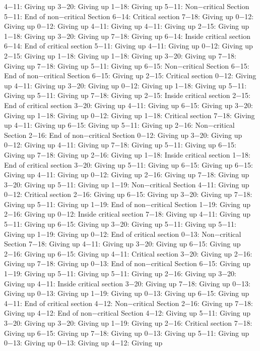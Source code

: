 4−11: Giving up
3−20: Giving up
1−18: Giving up
5−11: Non−critical Section
5−11: End of non−critical Section
6−14: Critical section
7−18: Giving up
0−12: Giving up
0−12: Giving up
4−11: Giving up
4−11: Giving up
2−15: Giving up
1−18: Giving up
3−20: Giving up
7−18: Giving up
6−14: Inside critical section
6−14: End of critical section
5−11: Giving up
4−11: Giving up
0−12: Giving up
2−15: Giving up
1−18: Giving up
1−18: Giving up
3−20: Giving up
7−18: Giving up
7−18: Giving up
5−11: Giving up
6−15: Non−critical Section
6−15: End of non−critical Section
6−15: Giving up
2−15: Critical section
0−12: Giving up
4−11: Giving up
3−20: Giving up
0−12: Giving up
1−18: Giving up
5−11: Giving up
5−11: Giving up
7−18: Giving up
2−15: Inside critical section
2−15: End of critical section
3−20: Giving up
4−11: Giving up
6−15: Giving up
3−20: Giving up
1−18: Giving up
0−12: Giving up
1−18: Critical section
7−18: Giving up
4−11: Giving up
6−15: Giving up
5−11: Giving up
2−16: Non−critical Section
2−16: End of non−critical Section
0−12: Giving up
3−20: Giving up
0−12: Giving up
4−11: Giving up
7−18: Giving up
5−11: Giving up
6−15: Giving up
7−18: Giving up
2−16: Giving up
1−18: Inside critical section
1−18: End of critical section
3−20: Giving up
5−11: Giving up
6−15: Giving up
6−15: Giving up
4−11: Giving up
0−12: Giving up
2−16: Giving up
7−18: Giving up
3−20: Giving up
5−11: Giving up
1−19: Non−critical Section
4−11: Giving up
0−12: Critical section
2−16: Giving up
6−15: Giving up
3−20: Giving up
7−18: Giving up
5−11: Giving up
1−19: End of non−critical Section
1−19: Giving up
2−16: Giving up
0−12: Inside critical section
7−18: Giving up
4−11: Giving up
5−11: Giving up
6−15: Giving up
3−20: Giving up
5−11: Giving up
5−11: Giving up
1−19: Giving up
0−12: End of critical section
0−13: Non−critical Section
7−18: Giving up
4−11: Giving up
3−20: Giving up
6−15: Giving up
2−16: Giving up
6−15: Giving up
4−11: Critical section
3−20: Giving up
2−16: Giving up
7−18: Giving up
0−13: End of non−critical Section
6−15: Giving up
1−19: Giving up
5−11: Giving up
5−11: Giving up
2−16: Giving up
3−20: Giving up
4−11: Inside critical section
3−20: Giving up
7−18: Giving up
0−13: Giving up
0−13: Giving up
1−19: Giving up
0−13: Giving up
6−15: Giving up
4−11: End of critical section
4−12: Non−critical Section
2−16: Giving up
7−18: Giving up
4−12: End of non−critical Section
4−12: Giving up
5−11: Giving up
3−20: Giving up
3−20: Giving up
1−19: Giving up
2−16: Critical section
7−18: Giving up
6−15: Giving up
7−18: Giving up
0−13: Giving up
5−11: Giving up
0−13: Giving up
0−13: Giving up
4−12: Giving up
